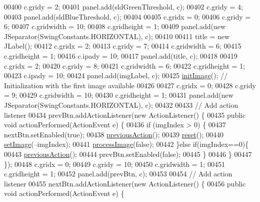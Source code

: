 \begin{DoxyCode}
{00400     c.gridy = 2;
00401     panel.add(sldGreenThreshold, c);
00402     c.gridy = 4;
00403     panel.add(sldBlueThreshold, c);
00404     
00405     c.gridx = 0;
00406     c.gridy = 6;
00407     c.gridwidth = 10;
00408     c.gridheight = 1;
00409     panel.add(\textcolor{keyword}{new} JSeparator(SwingConstants.HORIZONTAL), c);
00410 
00411     title = \textcolor{keyword}{new} JLabel();
00412     c.gridx = 2;
00413     c.gridy = 7;
00414     c.gridwidth = 6;
00415     c.gridheight = 1;
00416     c.ipady = 10;
00417     panel.add(title, c);
00418 
00419     c.gridx = 2;
00420     c.gridy = 8;
00421     c.gridwidth = 6;
00422     c.gridheight = 1;
00423     c.ipady = 10;
00424     panel.add(imgLabel, c);
00425     \hyperlink{classgui_1_1_image_analysis_window_a2ef8b75d07db675fb28ce54cc00713f0}{initImage}(); \textcolor{comment}{// Initialization with the first image available}
00426 
00427     c.gridx = 0;
00428     c.gridy = 9;
00429     c.gridwidth = 10;
00430     c.gridheight = 1;
00431     panel.add(\textcolor{keyword}{new} JSeparator(SwingConstants.HORIZONTAL), c);
00432 
00433     \textcolor{comment}{// Add action listener}
00434     prevBtn.addActionListener(\textcolor{keyword}{new} ActionListener() \{
00435       \textcolor{keyword}{public} \textcolor{keywordtype}{void} actionPerformed(ActionEvent e) \{
00436         \textcolor{keywordflow}{if} (imgIndex > 0) \{
00437           nextBtn.setEnabled(\textcolor{keyword}{true});
00438           \hyperlink{classgui_1_1_image_analysis_window_ae063bb485c7ec0a4a2eaf55d38397be1}{previousAction}();
00439           \hyperlink{classgui_1_1_image_analysis_window_ad20897c5c8bd47f5d4005989bead0e55}{reset}();
00440           \hyperlink{classgui_1_1_image_analysis_window_a3e14b1197961eed6fd530110e15380ec}{setImage}(--imgIndex);
00441           \hyperlink{classgui_1_1_image_analysis_window_a92de44ef00adbefce701ecb95b7d926b}{processImage}(\textcolor{keyword}{false});
00442         \}\textcolor{keywordflow}{else} \textcolor{keywordflow}{if}(imgIndex==0)\{
00443           \hyperlink{classgui_1_1_image_analysis_window_ae063bb485c7ec0a4a2eaf55d38397be1}{previousAction}();
00444           prevBtn.setEnabled(\textcolor{keyword}{false});
00445         \}
00446       \}
00447     \});
00448     c.gridx = 0;
00449     c.gridy = 10;
00450     c.gridwidth = 1;
00451     c.gridheight = 1;
00452     panel.add(prevBtn, c);
00453 
00454     \textcolor{comment}{// Add action listener}
00455     nextBtn.addActionListener(\textcolor{keyword}{new} ActionListener() \{
00456       \textcolor{keyword}{public} \textcolor{keywordtype}{void} actionPerformed(ActionEvent e) \{
}
\end{DoxyCode}

